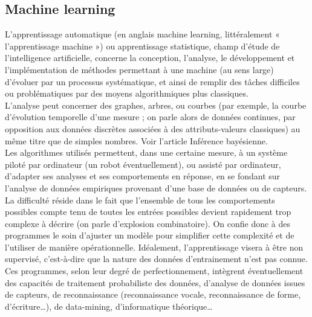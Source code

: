 \subsection{Machine learning}
L'apprentissage automatique (en anglais machine learning, littéralement « l'apprentissage machine ») ou apprentissage statistique, champ d'étude de l'intelligence artificielle, concerne la conception, l'analyse, le développement et l'implémentation de méthodes permettant à une machine (au sens large) d'évoluer par un processus systématique, et ainsi de remplir des tâches difficiles ou problématiques par des moyens algorithmiques plus classiques.\\[0.5cm]
L'analyse peut concerner des graphes, arbres, ou courbes (par exemple, la courbe d'évolution temporelle d'une mesure ; on parle alors de données continues, par opposition aux données discrètes associées à des attributs-valeurs classiques) au même titre que de simples nombres. Voir l'article Inférence bayésienne.\\[0.5cm]
Les algorithmes utilisés permettent, dans une certaine mesure, à un système piloté par ordinateur (un robot éventuellement), ou assisté par ordinateur, d'adapter ses analyses et ses comportements en réponse, en se fondant sur l'analyse de données empiriques provenant d'une base de données ou de capteurs.\\
La difficulté réside dans le fait que l'ensemble de tous les comportements possibles compte tenu de toutes les entrées possibles devient rapidement trop complexe à décrire (on parle d'explosion combinatoire). On confie donc à des programmes le soin d'ajuster un modèle pour simplifier cette complexité et de l'utiliser de manière opérationnelle. Idéalement, l'apprentissage visera à être non supervisé, c'est-à-dire que la nature des données d'entrainement n'est pas connue.\\[0.5cm]
Ces programmes, selon leur degré de perfectionnement, intègrent éventuellement des capacités de traitement probabiliste des données, d'analyse de données issues de capteurs, de reconnaissance (reconnaissance vocale, reconnaissance de forme, d'écriture…), de data-mining, d'informatique théorique…
